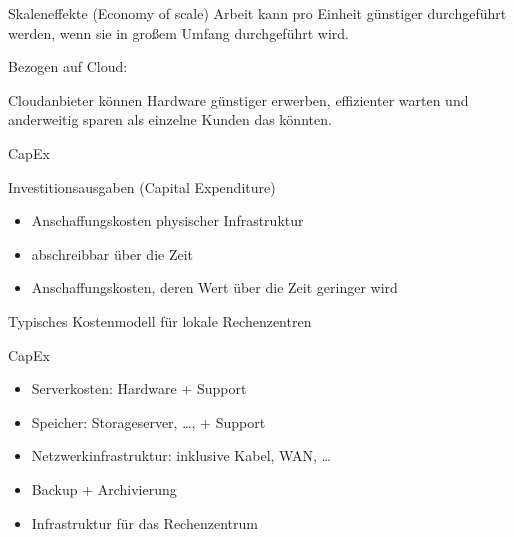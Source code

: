 \begin{flashcard}[Definition]{Skaleneffekte (Economy of scale)}
    Arbeit kann pro Einheit günstiger durchgeführt werden, wenn sie in großem Umfang durchgeführt wird.

    \vspace{5mm}
    Bezogen auf Cloud:

    Cloudanbieter können Hardware günstiger erwerben, effizienter warten und anderweitig sparen als einzelne Kunden das könnten.
\end{flashcard}

\begin{flashcard}[Definition]{CapEx}

    Investitionsausgaben (Capital Expenditure)
    \begin{itemize}
        \item Anschaffungskosten physischer Infrastruktur
        \item abschreibbar über die Zeit
        \item Anschaffungskosten, deren Wert über die Zeit geringer wird
    \end{itemize}

    Typisches Kostenmodell für lokale Rechenzentren

\end{flashcard}

\begin{flashcard}[Beispiele]{CapEx}
    \begin{itemize}
        \item Serverkosten: Hardware + Support
        \item Speicher: Storageserver, \ldots, + Support
        \item Netzwerkinfrastruktur: inklusive Kabel, WAN, \ldots
        \item Backup + Archivierung
        \item Infrastruktur für das Rechenzentrum
    \end{itemize}
\end{flashcard}

